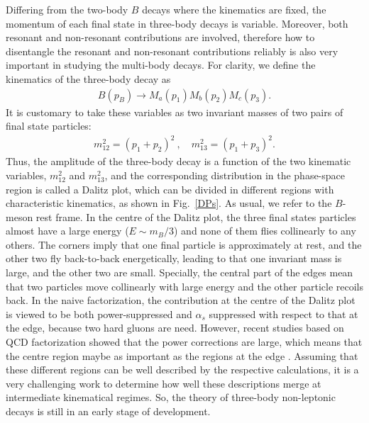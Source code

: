 \documentclass[11pt]{article}
\begin{document}
Differing from the two-body $B$ decays where the kinematics are fixed, the momentum of each final state in three-body decays is variable. Moreover, both resonant and non-resonant contributions are involved, therefore how to disentangle the resonant and non-resonant contributions reliably is also very important in studying the multi-body decays. For clarity, we define the kinematics of the three-body decay as
\begin{eqnarray}
B (p_B) \to M_a(p_1) M_b(p_2)M_c(p_3).
\end{eqnarray}
It is customary to take these variables as two invariant masses of two pairs of final state particles:
\begin{eqnarray}
m_{12}^2 = (p_1 + p_2)^2\ ,\quad m_{13}^2= (p_1 + p_3)^2.
\end{eqnarray}
Thus, the amplitude of the three-body decay is a function of the two kinematic variables, $m_{12}^2$ and $m_{13}^2$, and the corresponding distribution in the phase-space region is called a Dalitz plot, which can be divided in different regions with characteristic kinematics, as shown in Fig.~\ref{DPs}. As usual, we refer to the $B$-meson rest frame. In the centre of the Dalitz plot, the three final states particles almost have a large energy ($E\sim m_B/3$) and none of them flies collinearly to any others. The corners imply that one final particle is approximately at rest, and the other two fly back-to-back energetically, leading to that one invariant mass is large, and the other two are small. Specially,  the central part of the edges mean that two particles move collinearly with large energy and the other particle recoils back. In the naive factorization, the contribution at the centre of the Dalitz plot is viewed to be both power-suppressed and $\alpha_s$ suppressed with respect to that at the edge, because two hard gluons are need. However, recent studies based on QCD factorization showed that the power corrections are large, which means that the centre region maybe as important as the regions at the edge \cite{Virto:2016fbw, Krankl:2015fha}. Assuming that these different regions can be well described by the respective calculations, it is a very challenging work to determine how well these descriptions merge at intermediate kinematical regimes. So,  the theory of three-body non-leptonic decays is still in an early stage of development.
\end{document}
